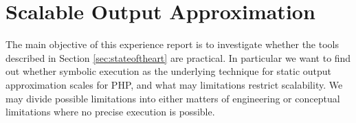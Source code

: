 \documentclass[preprint]{sig-alternate-05-2015}
\begin{document}



\section{Scalable Output Approximation}%
The main objective of this experience report is to investigate whether the
tools described in Section \ref{sec:stateoftheart} are practical. In particular
we want to find out whether symbolic execution as the underlying technique for
static output approximation scales for PHP, and what may limitations restrict
scalability. We may divide possible limitations into either matters of
engineering or conceptual limitations where no precise execution is possible.
\end{document}

